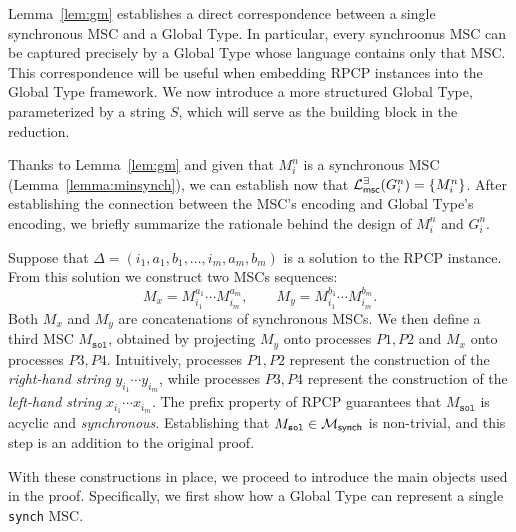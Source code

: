 Lemma~\ref{lem:gm} establishes a direct correspondence between a  
single synchronous MSC and a Global Type. In particular, every  
synchroonus MSC can be captured precisely by a Global Type whose  
language contains only that MSC. This correspondence will be useful  
when embedding RPCP instances into the Global Type framework.
We now introduce a more structured Global Type, parameterized by a  
string $S$, which will serve as the building block in the reduction.

Thanks to Lemma~\ref{lem:gm} and given that $M_i^n$
is a synchronous MSC (Lemma~\ref{lemma:minsynch}), 
we can establish now that 
$\mathcal{L}_{\mathsf{msc}}^{\exists}(G_i^n) =\{M_i^n\}$.
After establishing the connection between the MSC's encoding and
Global Type's encoding,
we briefly summarize the rationale behind the design of $M_i^n$ and $G_i^n$.

Suppose that $\Delta=(i_1,a_1,b_1,\ldots,i_m,a_m,b_m)$ is a  
solution to the RPCP instance. From this solution we construct   
two MSCs sequences:
\[
M_x = M^{a_1}_{i_1}\cdots M^{a_m}_{i_m}, \qquad  
M_y = M^{b_1}_{i_1}\cdots M^{b_m}_{i_m}.
\]
Both $M_x$ and $M_y$ are concatenations of synchronous  
MSCs. We then define a third MSC $M_{\texttt{sol}}$, obtained by  
projecting $M_y$ onto processes $P1,P2$ and $M_x$ onto processes  
$P3,P4$. Intuitively, processes $P1,P2$ represent the construction of  
the \emph{right-hand string} $y_{i_1}\cdots y_{i_m}$, while processes  
$P3,P4$ represent the construction of the \emph{left-hand string}  
$x_{i_1}\cdots x_{i_m}$. The prefix property of RPCP guarantees that  
$M_{\texttt{sol}}$ is acyclic and \emph{synchronous}. Establishing that 
$M_{\texttt{sol}} \in \mathcal{M}_{\mathsf{synch}}$ is non-trivial, and this 
step is an addition to the original proof. 

With these constructions in place, we proceed to introduce the main  
objects used in the proof. Specifically, we first show how a Global  
Type can represent a single \verb|synch| MSC.




